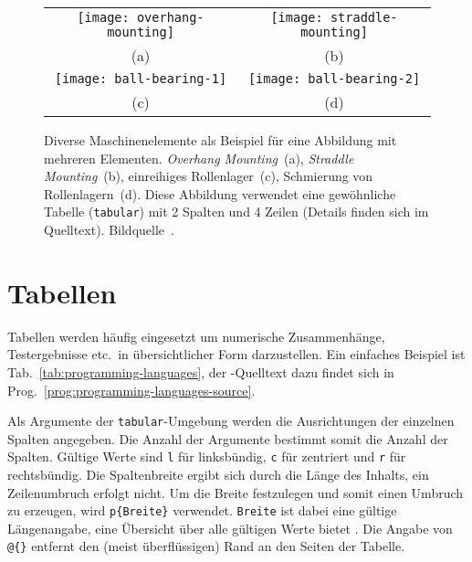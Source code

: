 \begin{figure}
\centering\small
\begin{tabular}{@{}c@{\hspace{12mm}}c@{}} %
  \texttt{[image: overhang-mounting]} &
  \texttt{[image: straddle-mounting]} 
\\
  (a) & (b)
\\[4pt]	%
  \texttt{[image: ball-bearing-1]} &
  \texttt{[image: ball-bearing-2]} 
\\
  (c) & (d)
\end{tabular}
%
\caption{Diverse Maschinenelemente als Beispiel für eine
Abbildung mit mehreren Elementen.
\emph{Overhang Mounting}~(a), \emph{Straddle Mounting}~(b),
einreihiges Rollenlager~(c), Schmierung von Rollenlagern~(d).
Diese Abbildung verwendet eine gewöhnliche Tabelle (\texttt{tabular}) mit
2 Spalten und 4 Zeilen (Details finden sich im Quelltext).
Bildquelle~\cite{Faires1934}.}
\label{fig:Bearings}
\end{figure}




\section{Tabellen}
\label{sec:tabellen}

Tabellen werden häufig eingesetzt um numerische Zusammenhänge, Testergebnisse
etc.\ in übersichtlicher Form darzustellen.
Ein einfaches Beispiel ist Tab.~\ref{tab:programming-languages}, der \latex-Quelltext dazu
findet sich in Prog.~\ref{prog:programming-languages-source}.

Als Argumente der \texttt{tabular}-Umgebung werden die Ausrichtungen der einzelnen Spalten
angegeben. Die Anzahl der Argumente bestimmt somit die Anzahl der Spalten. Gültige Werte sind
\texttt{l} für linksbündig, \texttt{c} für zentriert und \texttt{r} für rechtsbündig.
Die Spaltenbreite ergibt sich durch die Länge des Inhalts, ein Zeilenumbruch erfolgt nicht.
Um die Breite festzulegen und somit einen Umbruch zu erzeugen, wird \verb|p{Breite}| verwendet.
\texttt{Breite} ist dabei eine gültige Längenangabe, eine Übersicht über alle gültigen Werte
bietet \cite{WikibooksLaTeXLengths2018}. Die Angabe von \verb|@{}| entfernt den (meist
überflüssigen) Rand an den Seiten der Tabelle.

